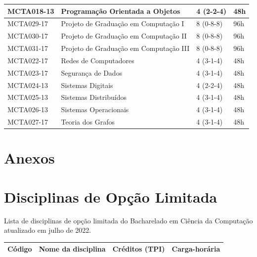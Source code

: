 \documentclass{article}
\begin{document}
\begin{longtable}{|p{}|p{}|p{}|p{}|}
\hline
MCTA018-13 & Programação Orientada a Objetos & 4 (2-2-4) & 48h \\
\hline
MCTA029-17 & Projeto de Graduação em Computação I & 8 (0-8-8) & 96h \\
\hline
MCTA030-17 & Projeto de Graduação em Computação II & 8 (0-8-8) & 96h \\
\hline
MCTA031-17 & Projeto de Graduação em Computação III & 8 (0-8-8) & 96h \\
\hline
MCTA022-17 & Redes de Computadores & 4 (3-1-4) & 48h \\
\hline
MCTA023-17 & Segurança de Dados & 4 (3-1-4) & 48h \\
\hline
MCTA024-13 & Sistemas Digitais & 4 (2-2-4) & 48h \\
\hline
MCTA025-13 & Sistemas Distribuídos & 4 (3-1-4) & 48h \\
\hline
MCTA026-13 & Sistemas Operacionais & 4 (3-1-4) & 48h\\
\hline
MCTA027-17 & Teoria dos Grafos & 4 (3-1-4) & 48h\\
\hline
\end{longtable}


\newpage
\section {Anexos}

\section {Disciplinas de Opção Limitada}
Lista de disciplinas de opção limitada do Bacharelado em Ciência da Computação atualizado em julho de 2022.

\begin{longtable}{|p{}|p{}|p{}|p{}|}
\hline
Código & Nome da disciplina & Créditos (TPI) & Carga-horária\\
\hline\hline
\end{longtable}
\end{document}
